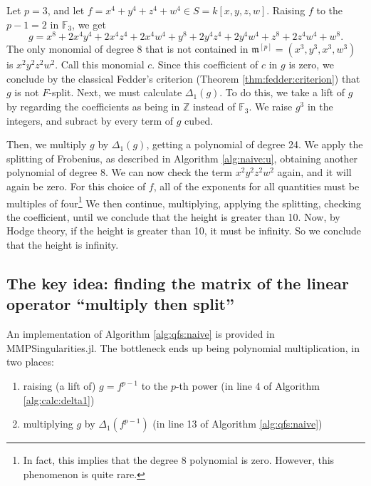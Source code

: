 \begin{ex}
    Let \(p=3\), and let
    \(f = x^4 + y^4 + z^4 + w^4 \in S = k[x,y,z,w]\).
    Raising \(f\) to the \(p-1 = 2\) in \(\mathbb{F}_{3}\), we get
    \[
    g = x^8 + 2x^4y^4 + 2x^4z^4 + 2x^4w^4 + y^8 + 2y^4z^4 + 2y^4w^4 + z^8 + 2z^4w^4 + w^8
    .\] 
    The only monomial of degree \(8\) that is not contained
    in \(\mathfrak{m}^{[p]} = (x^{3}, y^{3}, x^{3}, w^{3})\) is \(x^{2}y^{2}z^{2}w^{2}\).
    Call this monomial \(c\).
    Since this coefficient of \(c\) in \(g\) is zero, we conclude
    by the classical Fedder's criterion (Theorem \ref{thm:fedder:criterion})
    that \(g\) is not \(F\)-split.
    Next, we must calculate \(\Delta_{1}(g)\).
    To do this, we take a lift of \(g\) by regarding the coefficients
    as being in \(\mathbb{Z}\) instead of \(\mathbb{F}_{3}\).
    We raise \(g^3\) in the integers, and subract by every term of \(g\) 
    cubed.

    Then, we multiply \(g\) by \(\Delta_{1}(g)\), getting a polynomial of degree 24.
    We apply the splitting of Frobenius, as described in Algorithm \ref{alg:naive:u}, 
    obtaining another polynomial of degree \(8\). 
    We can now check the term \(x^2y^2z^2w^2\) again, and it will again be zero. 
    For this choice of $f$, all of the exponents for all quantities 
    must be multiples of four\footnote{
    In fact, this implies that the degree \(8\) polynomial is zero.
    However, this phenomenon is quite rare.
    }
    We then continue, multiplying, applying the splitting, checking the coefficient, 
    until we conclude that the height is greater than 10. 
    Now, by Hodge theory, if the height is greater than 10, it must be infinity. 
    So we conclude that the height is infinity.
\end{ex}

\subsection{The key idea: finding the matrix of the linear operator ``multiply then split''}

An implementation of Algorithm \ref{alg:qfs:naive}
is provided in MMPSingularities.jl.
The bottleneck ends up being polynomial multiplication, 
in two places:
\begin{enumerate}[(1)]
    \item raising (a lift of) \(g = f^{p-1}\) to the \(p\)-th power 
        (in line 4 of Algorithm \ref{alg:calc:delta1})
    \item multiplying \(g\) by \(\Delta_{1}(f^{p-1})\) 
        (in line 13 of Algorithm \ref{alg:qfs:naive})
\end{enumerate}

